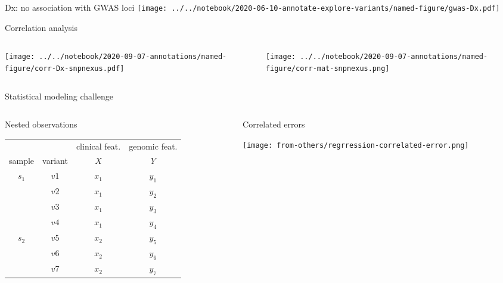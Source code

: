 \documentclass{beamer}
\begin{document}
\begin{frame}{Dx: no association with GWAS loci}
\texttt{[image: ../../notebook/2020-06-10-annotate-explore-variants/named-figure/gwas-Dx.pdf]}
\end{frame}


\begin{frame}{Correlation analysis}
\begin{columns}[t]
\begin{column}{0.4\textwidth}

\texttt{[image: ../../notebook/2020-09-07-annotations/named-figure/corr-Dx-snpnexus.pdf]}
\end{column}

\begin{column}{0.5\textwidth}

\texttt{[image: ../../notebook/2020-09-07-annotations/named-figure/corr-mat-snpnexus.png]}
\end{column}
\end{columns}
\end{frame}

\begin{frame}{Statistical modeling challenge}
\footnotesize
\begin{columns}[t]
\begin{column}{0.6\textwidth}
\begin{center}
Nested observations
\end{center}
\begin{center}
\begin{tabular}{cc|c|c}
& & clinical feat. & genomic feat. \\
sample & variant & \(X\) & \(Y\) \\
\hline
\multirow{4}{*}{\(s_1\)} & \(v1\) & \(x_1\) & \(y_1\) \\
& \(v2\) & \(x_1\) & \(y_2\) \\
& \(v3\) & \(x_1\) & \(y_3\) \\
& \(v4\) & \(x_1\) & \(y_4\) \\
\hline
\multirow{3}{*}{\(s_2\)} & \(v5\) & \(x_2\) & \(y_5\) \\
& \(v6\) & \(x_2\) & \(y_6\) \\
& \(v7\) & \(x_2\) & \(y_7\) \\
\end{tabular}
\end{center}
\end{column}

\begin{column}{0.4\textwidth}
\begin{center}
Correlated errors
\end{center}
\texttt{[image: from-others/regrression-correlated-error.png]}
\end{column}
\end{columns}
\end{frame}
\end{document}
